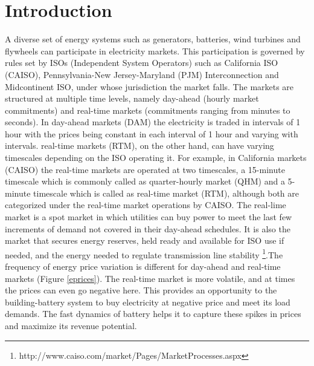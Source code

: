 \documentclass[11pt,twoside]{article}
\begin{document}
\section{Introduction}
A diverse set of energy systems such as generators, batteries, wind turbines and flywheels can participate in electricity markets. This participation is governed by rules set by ISOs (Independent System Operators) such as California ISO (CAISO), Pennsylvania-New Jersey-Maryland (PJM) Interconnection and Midcontinent ISO, under whose jurisdiction the market falls. The markets are structured at multiple time levels, namely day-ahead (hourly market commitments) and real-time markets (commitments ranging from minutes to seconds). In day-ahead markets (DAM) the electricity is traded in intervals of 1 hour with the prices being constant in each interval of 1 hour and varying with intervals. real-time markets (RTM), on the other hand, can have varying timescales depending on the ISO operating it. For example, in California markets (CAISO) the real-time markets are operated at two timescales, a 15-minute timescale which is commonly called as quarter-hourly market (QHM) and a 5-minute timescale which is called as real-time market (RTM), although both are categorized under the real-time market operations by CAISO. The real-lime market is a spot market in which utilities can buy power to meet the last few increments of demand not covered in their day-ahead schedules. It is also the market that secures energy reserves, held ready and available for ISO use if needed, and the energy needed to regulate transmission line stability \footnote{http://www.caiso.com/market/Pages/MarketProcesses.aspx}.The frequency of energy price variation is different for day-ahead and real-time markets (Figure \ref{eprices}). The real-time market is more volatile, and at times the prices can even go negative here. This provides an opportunity to the building-battery system to buy electricity at negative price and meet its load demands. The fast dynamics of battery helps it to capture these spikes in prices and maximize its revenue potential. 
\end{document}
